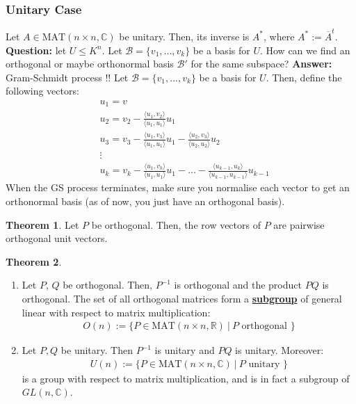 \documentclass[11pt]{scrartcl}
\theoremstyle{definition}
\newtheorem{theorem}{Theorem}
\theoremstyle{remark}
\newcommand{\dfn}[1]{\textbf{\underline{#1}}}
\newcommand{\C}[0]{\mathbb{C}}
\newcommand{\matn}[1]{\text{MAT}(n\times n, \mathbb{#1})}
\begin{document}
\subsubsection{Unitary Case}
Let $A \in \matn{C}$ be unitary. Then, its inverse is $A^*$, where $A^* := \overline{A}^t$. 
\newline
\newline 
\textbf{Question:} let $U \leq K^n$. Let $\mathcal{B} = \{ v_1, ..., v_k \}$ be a basis for $U$. How can we find an orthogonal or maybe orthonormal basis $\mathcal{B}'$ for the same subspace? 
\newline
\newline
\textbf{Answer:} Gram-Schmidt process !! 
Let $\mathcal{B} = \{ v_1, ..., v_k \}$ be a basis for $U$. Then, define the following vectors: 
\begin{align*}
	& u_1 = v \\
	& u_2 = v_2 - \frac{\langle u_1, v_2 \rangle}{\langle u_1, u_1 \rangle} u_1 \\
	& u_3 = v_3 - \frac{\langle u_1, v_3 \rangle}{\langle u_1, u_1 \rangle} u_1 - \frac{\langle u_2, v_3 \rangle}{\langle u_2, u_2 \rangle} u_2 \\
	& \vdots \\
	& u_k = v_k - \frac{\langle u_1, v_k \rangle}{\langle u_1, u_1 \rangle} u_1 - ... - \frac{\langle u_{k-1}, u_k \rangle}{\langle u_{k-1}, u_{k-1} \rangle} u_{k-1} 
\end{align*}
When the GS process terminates, make sure you normalise each vector to get an orthonormal basis (as of now, you just have an orthogonal basis). 

\begin{theorem}
	Let $P$ be orthogonal. Then, the row vectors of $P$ are pairwise orthogonal unit vectors.
\end{theorem}

\begin{theorem}
	\begin{enumerate}[noitemsep]
		\item Let $P$, $Q$ be orthogonal. Then, $P^{-1}$ is orthogonal and the product $PQ$ is orthogonal. The set of all orthogonal matrices form a \dfn{subgroup} of general linear with respect to matrix multiplication: 
		\begin{align}
			O(n) := \{ P \in \matn{R}\ |\ P \text{ orthogonal } \} 	
		\end{align}
		\item Let $P, Q$ be unitary. Then $P^{-1}$ is unitary and $PQ$ is unitary. Moreover: 
		\begin{align}
			U(n) := \{ P \in \matn{C}\ |\ P \text{ unitary } \} 	
		\end{align}
		is a group with respect to matrix multiplication, and is in fact a subgroup of $GL(n, \C)$. 
	\end{enumerate}
\end{theorem}
\end{document}
